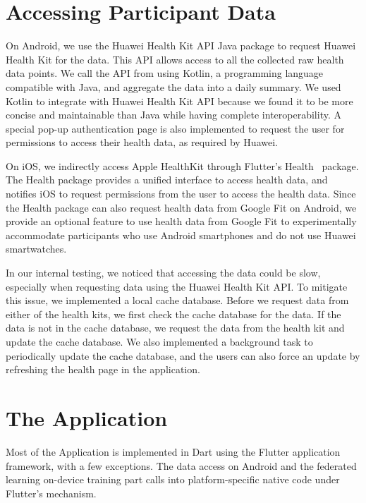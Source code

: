 \section{Accessing Participant Data}

On Android, we use the Huawei Health Kit API Java package to request
Huawei Health Kit for the data.
This API allows access to all the collected raw health data points.
We call the API from using Kotlin,
a programming language compatible with Java,
and aggregate the data into a daily summary.
We used Kotlin to integrate with Huawei Health Kit API because
we found it to be more concise and maintainable than Java while
having complete interoperability.
A special pop-up authentication page is also implemented to request the user for
permissions to access their health data, as required by Huawei.

On iOS, we indirectly access Apple HealthKit through Flutter's
Health~\cite{flutterhealth} package.
The Health package provides a unified interface to access health data,
and notifies iOS to request permissions from the user to access the health data.
Since the Health package can also request health data from Google Fit on
Android, we provide an optional feature to use health data from Google Fit to
experimentally accommodate participants who use Android smartphones and
do not use Huawei smartwatches.

In our internal testing, we noticed that accessing the data could be slow,
especially when requesting data using the Huawei Health Kit API.
To mitigate this issue, we implemented a local cache database.
Before we request data from either of the health kits,
we first check the cache database for the data.
If the data is not in the cache database,
we request the data from the health kit and update the cache database.
We also implemented a background task to periodically update the cache database,
and the users can also force an update by refreshing the health page in
the application.

\section{The \fedcampus Application}

Most of the \fedcampus Application is implemented in Dart using
the Flutter application framework, with a few exceptions.
The data access on Android and the federated learning on-device training part
calls into platform-specific native code under Flutter's mechanism.

